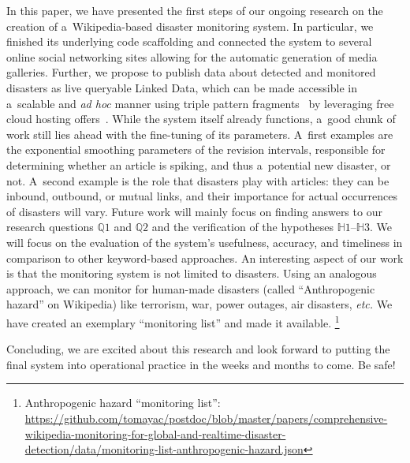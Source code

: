 \documentclass[letterpaper]{article}
\begin{document}
In this paper, we have presented the first steps of our ongoing research
on the creation of a~Wikipedia-based disaster monitoring system.
In particular, we finished its underlying code scaffolding
and connected the system to several online social networking sites
allowing for the automatic generation of media galleries.
Further, we propose to publish data about detected
and monitored disasters as live queryable Linked Data,
which can be made accessible in a~scalable and \emph{ad hoc} manner
using triple pattern fragments~\cite{verborgh2014ldfiswc}
by leveraging free cloud hosting offers~\cite{DBLP:conf/semweb/MatteisV14}.
While the system itself already functions, a~good chunk of work still lies ahead
with the fine-tuning of its parameters.
A~first examples are the exponential smoothing parameters
of the revision intervals, responsible for determining whether an article
is spiking, and thus a~potential new disaster, or not.
A~second example is the role that disasters play with articles:
they can be inbound, outbound, or mutual links,
and their importance for actual occurrences of disasters will vary.
Future work will mainly focus on finding answers to our research questions
$\mathbb{Q}1$ and $\mathbb{Q}2$ and the verification of the hypotheses
$\mathbb{H}1$--$\mathbb{H}3$.
We will focus on the evaluation of the system's usefulness, accuracy,
and timeliness in comparison to other keyword-based approaches.
An interesting aspect of our work is that the monitoring system
is not limited to disasters.
Using an analogous approach, we can monitor for human-made disasters
(called ``Anthropogenic hazard'' on Wikipedia)
like terrorism, war, power outages, air disasters, \emph{etc.}
We have created an exemplary ``monitoring list'' and made it available.%
\footnote{Anthropogenic hazard ``monitoring list'':
\url{https://github.com/tomayac/postdoc/blob/master/papers/comprehensive-wikipedia-monitoring-for-global-and-realtime-disaster-detection/data/monitoring-list-anthropogenic-hazard.json}}

Concluding, we are excited about this research
and look forward to putting the final system into operational practice
in the weeks and months to come.
Be safe!




\end{document}
